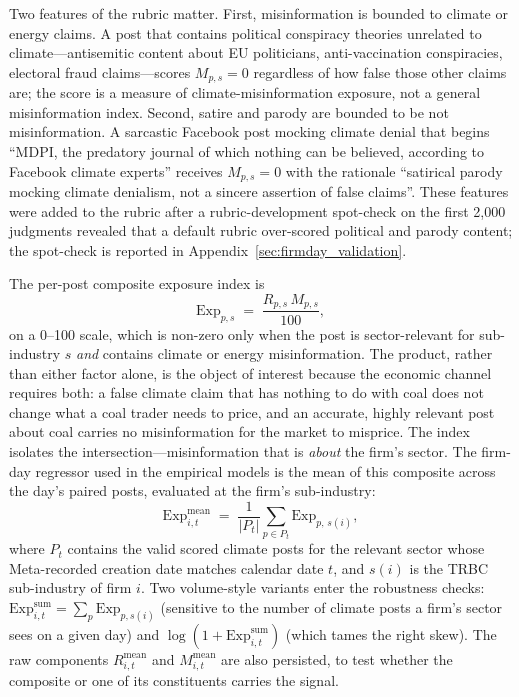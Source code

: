 \documentclass{article}
\theoremstyle{plain}
\begin{document}
Two features of the rubric matter. First, misinformation is bounded to climate or energy claims. A post that contains political conspiracy theories unrelated to climate---antisemitic content about EU politicians, anti-vaccination conspiracies, electoral fraud claims---scores $M_{p,s}=0$ regardless of how false those other claims are; the score is a measure of climate-misinformation exposure, not a general misinformation index. Second, satire and parody are bounded to be not misinformation. A sarcastic Facebook post mocking climate denial that begins ``MDPI, the predatory journal of which nothing can be believed, according to Facebook climate experts'' receives $M_{p,s}=0$ with the rationale ``satirical parody mocking climate denialism, not a sincere assertion of false claims''. These features were added to the rubric after a rubric-development spot-check on the first 2,000 judgments revealed that a default rubric over-scored political and parody content; the spot-check is reported in Appendix~\ref{sec:firmday_validation}.

The per-post composite exposure index is
\begin{equation}
\mathrm{Exp}_{p,s} \;=\; \frac{R_{p,s}\,M_{p,s}}{100},
\label{eq:exposure_post}
\end{equation}
on a 0--100 scale, which is non-zero only when the post is sector-relevant for sub-industry $s$ \emph{and} contains climate or energy misinformation. The product, rather than either factor alone, is the object of interest because the economic channel requires both: a false climate claim that has nothing to do with coal does not change what a coal trader needs to price, and an accurate, highly relevant post about coal carries no misinformation for the market to misprice. The index isolates the intersection---misinformation that is \emph{about} the firm's sector. The firm-day regressor used in the empirical models is the mean of this composite across the day's paired posts, evaluated at the firm's sub-industry:
\begin{equation}
\mathrm{Exp}^{\text{mean}}_{i,t} \;=\; \frac{1}{|P_t|}\sum_{p \in P_t} \mathrm{Exp}_{p,\,s(i)},
\label{eq:exposure_firmday}
\end{equation}
where $P_t$ contains the valid scored climate posts for the relevant sector whose Meta-recorded creation date matches calendar date $t$, and $s(i)$ is the TRBC sub-industry of firm $i$. Two volume-style variants enter the robustness checks: $\mathrm{Exp}^{\text{sum}}_{i,t}=\sum_p \mathrm{Exp}_{p,s(i)}$ (sensitive to the number of climate posts a firm's sector sees on a given day) and $\log(1+\mathrm{Exp}^{\text{sum}}_{i,t})$ (which tames the right skew). The raw components $R^{\text{mean}}_{i,t}$ and $M^{\text{mean}}_{i,t}$ are also persisted, to test whether the composite or one of its constituents carries the signal.
\end{document}

